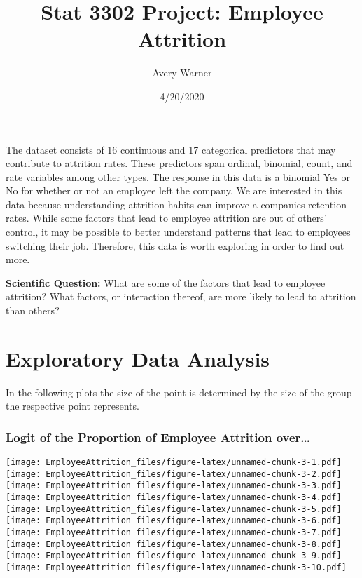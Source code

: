 \documentclass[]{article}
\title{Stat 3302 Project: Employee Attrition}
\author{Avery Warner}
\date{4/20/2020}
\begin{document}
\maketitle

The dataset consists of 16 continuous and 17 categorical predictors that
may contribute to attrition rates. These predictors span ordinal,
binomial, count, and rate variables among other types. The response in
this data is a binomial Yes or No for whether or not an employee left
the company. We are interested in this data because understanding
attrition habits can improve a companies retention rates. While some
factors that lead to employee attrition are out of others' control, it
may be possible to better understand patterns that lead to employees
switching their job. Therefore, this data is worth exploring in order to
find out more.

\textbf{Scientific Question:} What are some of the factors that lead to
employee attrition? What factors, or interaction thereof, are more
likely to lead to attrition than others?

\hypertarget{exploratory-data-analysis}{%
\section{Exploratory Data Analysis}\label{exploratory-data-analysis}}

In the following plots the size of the point is determined by the size
of the group the respective point represents.

\hypertarget{logit-of-the-proportion-of-employee-attrition-over}{%
\subsubsection{Logit of the Proportion of Employee Attrition
over\ldots{}}\label{logit-of-the-proportion-of-employee-attrition-over}}

\texttt{[image: EmployeeAttrition\_files/figure-latex/unnamed-chunk-3-1.pdf]}
\texttt{[image: EmployeeAttrition\_files/figure-latex/unnamed-chunk-3-2.pdf]}
\texttt{[image: EmployeeAttrition\_files/figure-latex/unnamed-chunk-3-3.pdf]}
\texttt{[image: EmployeeAttrition\_files/figure-latex/unnamed-chunk-3-4.pdf]}
\texttt{[image: EmployeeAttrition\_files/figure-latex/unnamed-chunk-3-5.pdf]}
\texttt{[image: EmployeeAttrition\_files/figure-latex/unnamed-chunk-3-6.pdf]}
\texttt{[image: EmployeeAttrition\_files/figure-latex/unnamed-chunk-3-7.pdf]}
\texttt{[image: EmployeeAttrition\_files/figure-latex/unnamed-chunk-3-8.pdf]}
\texttt{[image: EmployeeAttrition\_files/figure-latex/unnamed-chunk-3-9.pdf]}
\texttt{[image: EmployeeAttrition\_files/figure-latex/unnamed-chunk-3-10.pdf]}
\end{document}
